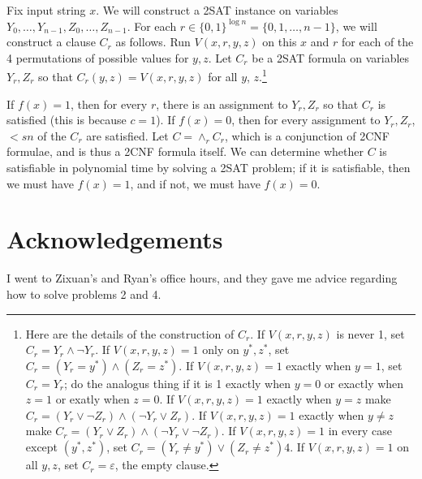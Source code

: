 \documentclass{article}
\def \eps {{\varepsilon}}
\begin{document}
Fix input string $x$.
We will construct a 2SAT instance on variables $Y_0, \dots, Y_{n-1}, Z_0, \dots, Z_{n-1}$.
For each $r \in \{0, 1\}^{\log n} = \{0, 1, \dots, n-1\}$, we will construct a clause
$C_r$ as follows.
Run $V(x, r, y, z)$ on this $x$ and $r$ for each of the 4 permutations of possible
values for $y, z$.
Let $C_r$ be a 2SAT formula on variables $Y_r, Z_r$ so that $C_r(y, z) = V(x, r, y, z)$ for all $y$, $z$.\footnote{
Here are the details of the construction of $C_r$.
If $V(x, r, y, z)$ is never 1, set $C_r = Y_r \wedge \neg Y_r$.
If $V(x, r, y, z) = 1$ only on $y^*, z^*$, set $C_r = (Y_r = y^*) \wedge (Z_r = z^*)$.
If $V(x, r, y, z) = 1$ exactly when $y = 1$, set $C_r = Y_r$; do the analogus thing if it is 1 exactly when $y = 0$ or exactly when $z = 1$ or exatly when $z = 0$.
If $V(x, r, y, z) = 1$ exactly when $y = z$ make $C_r = (Y_r \vee \neg Z_r) \wedge (\neg Y_r \vee Z_r)$.
If $V(x, r, y, z) = 1$ exactly when $y \neq z$ make $C_r = (Y_r \vee Z_r) \wedge (\neg Y_r \vee \neg Z_r)$.
If $V(x, r, y, z) = 1$ in every case except $(y^*, z^*)$, set $C_r = (Y_r \neq y^*) \vee (Z_r \neq z^*)4$.
If $V(x, r, y, z) = 1$ on all $y, z$, set $C_r = \eps$, the empty clause.
}

If $f(x) = 1$, then for every $r$, there is an assignment to $Y_r, Z_r$ so that $C_r$ is satisfied (this is because $c = 1$).
If $f(x) = 0$, then for every assignment to $Y_r, Z_r$,
$< sn$ of the $C_r$ are satisfied.
Let $C = \wedge_{r} C_r$, which is a conjunction of 2CNF formulae, and is thus a 2CNF formula itself.
We can determine whether $C$ is satisfiable in polynomial time by solving a 2SAT problem; if it is satisfiable, then we must have $f(x) = 1$, and if not, we must have $f(x) = 0$.

\newpage
\section*{Acknowledgements}
I went to Zixuan's and Ryan's office hours, and they gave me advice regarding how to solve problems 2 and 4.
\end{document}
